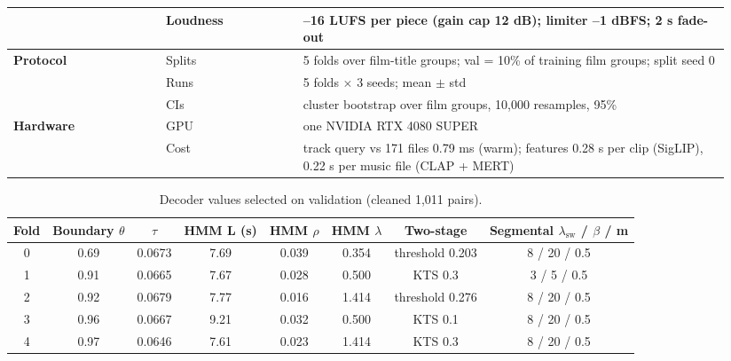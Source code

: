 \begin{longtable}{@{}p{0.2\linewidth}p{0.18\linewidth}p{0.56\linewidth}@{}}
 & Loudness & --16 LUFS per piece (gain cap 12 dB); limiter --1 dBFS; 2 s fade-out\\
\midrule
\textbf{Protocol} & Splits & 5 folds over film-title groups; val = 10\% of training film groups; split seed 0\\
 & Runs & 5 folds $\times$ 3 seeds; mean $\pm$ std\\
 & CIs & cluster bootstrap over film groups, 10,000 resamples, 95\%\\
\midrule
\textbf{Hardware} & GPU & one NVIDIA RTX 4080 SUPER\\
 & Cost & track query vs 171 files 0.79 ms (warm); features 0.28 s per clip (SigLIP), 0.22 s per music file (CLAP + MERT)\\
\end{longtable}
\endgroup

\begin{table}[t]\centering\footnotesize
\caption{Decoder values selected on validation (cleaned 1,011 pairs).}\label{tab:decoder-tuned}
\begin{tabular}{@{}cccccccc@{}}\toprule
Fold & Boundary $\theta$ & $\tau$ & HMM L (s) & HMM $\rho$ & HMM $\lambda$ & Two-stage & Segmental $\lambda_{\mathrm{sw}}$ / $\beta$ / m\\ \midrule
0 & 0.69 & 0.0673 & 7.69 & 0.039 & 0.354 & threshold 0.203 & 8 / 20 / 0.5\\
1 & 0.91 & 0.0665 & 7.67 & 0.028 & 0.500 & KTS 0.3 & 3 / 5 / 0.5\\
2 & 0.92 & 0.0679 & 7.77 & 0.016 & 1.414 & threshold 0.276 & 8 / 20 / 0.5\\
3 & 0.96 & 0.0667 & 9.21 & 0.032 & 0.500 & KTS 0.1 & 8 / 20 / 0.5\\
4 & 0.97 & 0.0646 & 7.61 & 0.023 & 1.414 & KTS 0.3 & 8 / 20 / 0.5\\
\bottomrule\end{tabular}
\end{table}
